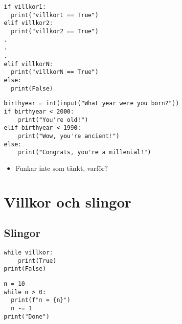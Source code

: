 \begin{frame}[fragile]
  \begin{lstlisting}[basicstyle=\large,numbers=none]
if villkor1:
  print("villkor1 == True")
elif villkor2:
  print("villkor2 == True")
.
.
.
elif villkorN:
  print("villkorN == True")
else:
  print(False)
  \end{lstlisting}
\end{frame}

\begin{frame}[fragile]
  \begin{example}
    \begin{lstlisting}
birthyear = int(input("What year were you born?"))
if birthyear < 2000:
    print("You're old!")
elif birthyear < 1990:
    print("Wow, you're ancient!")
else:
    print("Congrats, you're a millenial!")
    \end{lstlisting}
  \end{example}

  \pause

  \begin{question}
    \begin{itemize}
      \item Funkar inte som tänkt, varför?
    \end{itemize}
  \end{question}
\end{frame}


\section{Villkor och slingor}

\subsection{Slingor}

\begin{frame}[fragile]
  \begin{center}
    \begin{lstlisting}[basicstyle=\Large,numbers=none]
while villkor:
    print(True)
print(False)
    \end{lstlisting}
  \end{center}
\end{frame}

\begin{frame}[fragile]
  \begin{example}
    \begin{lstlisting}
n = 10
while n > 0:
  print(f"n = {n}")
  n -= 1
print("Done")
    \end{lstlisting}
  \end{example}
\end{frame}

